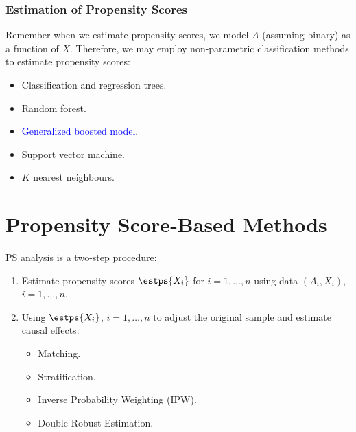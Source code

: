 \subsection*{Estimation of Propensity Scores}
Remember when we estimate propensity scores, we model $A$
(assuming binary) as a function of $X$. Therefore, we may employ
non-parametric classification methods to estimate propensity scores:
\begin{itemize}
      \item Classification and regression trees.
      \item Random forest.
      \item \textcolor{Blue}{Generalized boosted model}.
      \item Support vector machine.
      \item $K$ nearest neighbours.
\end{itemize}
\chapter{Propensity Score-Based Methods}
PS analysis is a two-step procedure:
\begin{enumerate}[1.]
      \item Estimate propensity scores $ \estps{X_i} $ for $ i=1,\ldots,n $ using data $ (A_i,X_i) $, $ i=1,\ldots,n $.
      \item Using $ \estps{X_i} $, $ i=1,\ldots,n $ to adjust the original sample and estimate causal effects:
            \begin{itemize}
                  \item Matching.
                  \item Stratification.
                  \item Inverse Probability Weighting (IPW).
                  \item Double-Robust Estimation.
            \end{itemize}
\end{enumerate}
